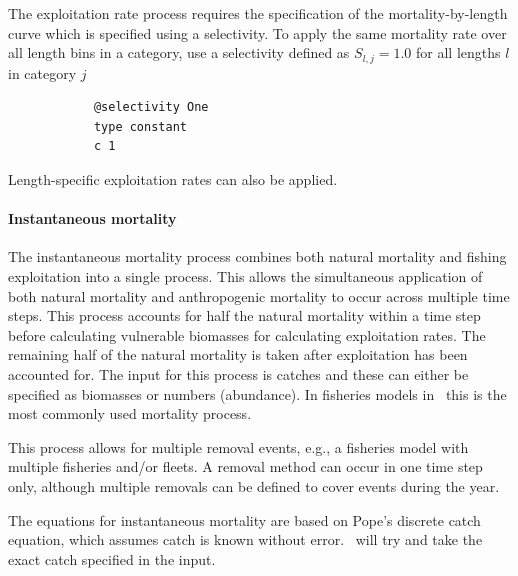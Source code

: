 The exploitation rate process requires the specification of the mortality-by-length curve which is specified using a selectivity. To apply the same mortality rate over all length bins in a category, use a selectivity defined as $S_{l,j}=1.0$ for all lengths $l$ in category $j$

{\small{\begin{verbatim}
			@selectivity One
			type constant
			c 1
\end{verbatim}}}

Length-specific exploitation rates can also be applied. 

\paragraph{Instantaneous mortality}\label{sec:Process-MortalityInstantaneous}

The instantaneous mortality process combines both natural mortality and fishing exploitation into a single process. This allows the simultaneous application of both natural mortality and anthropogenic mortality to occur across multiple time steps. This process accounts for half the natural mortality within a time step before calculating vulnerable biomasses for calculating exploitation rates. The remaining half of the natural mortality is taken after exploitation has been accounted for. The input for this process is catches and these can either be specified as biomasses or numbers (abundance). In fisheries models in \CNAME\ this is the most commonly used mortality process.

This process allows for multiple removal events, e.g., a fisheries model with multiple fisheries and/or fleets. A removal method can occur in one time step only, although multiple removals can be defined to cover events during the year.

The equations for instantaneous mortality are based on Pope's discrete catch equation, which assumes catch is known without error. \CNAME\ will try and take the exact catch specified in the input.

